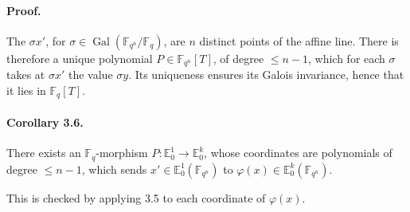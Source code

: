 \documentclass[11pt]{article}
\newcommand{\F}{\mathbb{F}}
\newcommand{\Gal}{\operatorname{Gal}}
\begin{document}
\paragraph{Proof.}
The $\sigma x'$, for $\sigma\in\Gal(\F_{q^n}/\F_q)$, are $n$ distinct points of the affine line.
There is therefore a unique polynomial $P\in\F_{q^n}[T]$, of degree $\le n-1$, which for each $\sigma$ takes at $\sigma x'$ the value $\sigma y$.
Its uniqueness ensures its Galois invariance, hence that it lies in $\F_q[T]$.

\paragraph{Corollary 3.6.}
There exists an $\F_q$-morphism $P:\mathbb E^1_0\to\mathbb E^k_0$, whose coordinates are polynomials of degree $\le n-1$, which sends $x'\in\mathbb E^1_0(\F_{q^n})$ to $\varphi(x)\in\mathbb E^k_0(\F_{q^n})$.

This is checked by applying 3.5 to each coordinate of $\varphi(x)$.
\end{document}
